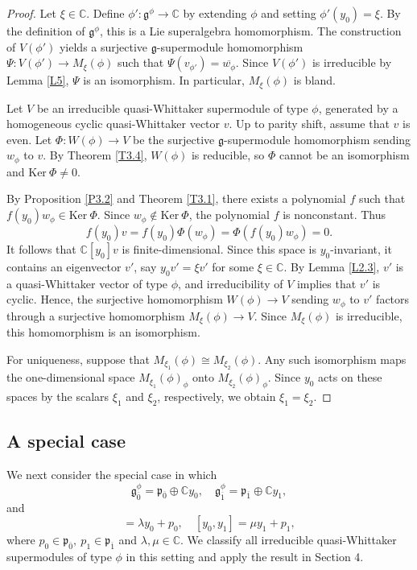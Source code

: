 \documentclass[12pt,reqno]{article}
\def\o{\overline}
\def\la{\lambda}
\def\F{\mathfrak}
\def\r{\mathrm}
\def\CC{\mathbb{C}}
\def\beqn{\begin{equation*}}
\def\eeqn{\end{equation*}}
\begin{document}
\begin{proof}
Let $\xi\in\CC$. Define $\phi'\colon\F{g}^\phi\rightarrow\CC$ by extending $\phi$ and setting $\phi'(y_0)=\xi$. By the definition of $\F{g}^\phi$, this is a Lie superalgebra homomorphism. The construction of $V(\phi')$ yields a surjective $\F{g}$-supermodule homomorphism $\Psi\colon V(\phi')\rightarrow M_\xi(\phi)$ such that $\Psi(v_{\phi'})=\o{w_\phi}$. Since $V(\phi')$ is irreducible by Lemma \ref{L5}, $\Psi$ is an isomorphism. In particular, $M_\xi(\phi)$ is bland.


Let $V$ be an irreducible quasi-Whittaker supermodule of type $\phi$, generated by a homogeneous cyclic quasi-Whittaker vector $v$. Up to parity shift, assume that $v$ is even. Let $\Phi\colon W(\phi)\rightarrow V$ be the surjective $\F{g}$-supermodule homomorphism sending $w_\phi$ to $v$. By Theorem \ref{T3.4}, $W(\phi)$ is reducible, so $\Phi$ cannot be an isomorphism and $\r{Ker}~\Phi\neq0$.

By Proposition \ref{P3.2} and Theorem \ref{T3.1}, there exists a polynomial $f$ such that $f(y_0)w_\phi\in\r{Ker}~\Phi$. Since $w_\phi\notin\r{Ker}~\Phi$, the polynomial $f$ is nonconstant. Thus
\beqn
f(y_0)v=f(y_0)\Phi(w_\phi)=\Phi(f(y_0)w_\phi)=0.
\eeqn
It follows that $\CC[y_0]v$ is finite-dimensional. Since this space is $y_0$-invariant, it contains an eigenvector $v'$, say $y_0v'=\xi v'$ for some $\xi\in\CC$. By Lemma \ref{L2.3}, $v'$ is a quasi-Whittaker vector of type $\phi$, and irreducibility of $V$ implies that $v'$ is cyclic. Hence, the surjective homomorphism $W(\phi)\rightarrow V$ sending $w_\phi$ to $v'$ factors through a surjective homomorphism $M_\xi(\phi)\rightarrow V$. Since $M_\xi(\phi)$ is irreducible, this homomorphism is an isomorphism.

For uniqueness, suppose that $M_{\xi_1}(\phi)\cong M_{\xi_2}(\phi)$. Any such isomorphism maps the one-dimensional space $M_{\xi_1}(\phi)_\phi$ onto $M_{\xi_2}(\phi)_\phi$. Since $y_0$ acts on these spaces by the scalars $\xi_1$ and $\xi_2$, respectively, we obtain $\xi_1=\xi_2$.
\end{proof}


\subsection{A special case}

We next consider the special case in which
\beqn
\F{g}^\phi_{\o{0}}=\F{p}_{\o{0}}\oplus\CC y_0,\quad \F{g}^\phi_{\o{1}}=\F{p}_{\o{1}}\oplus\CC y_1,
\eeqn
and
\beqn
[y_1,y_1]=\la y_0+p_0,\quad [y_0,y_1]=\mu y_1+p_1,
\eeqn
where $p_0\in \F{p}_{\o{0}},~p_1\in\F{p}_{\o{1}}$ and $\la,\mu\in\CC$. 
We classify all irreducible quasi-Whittaker supermodules of type $\phi$ in this setting and apply the result in Section 4.
\end{document}
